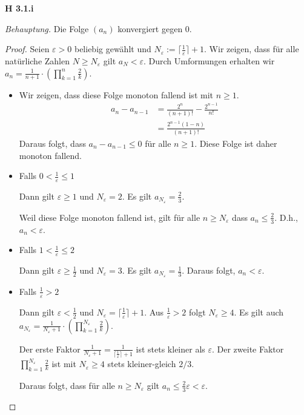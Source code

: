 \documentclass[12pt]{extarticle}
\begin{document}
\textbf{H 3.1.i}

\textit{Behauptung.} Die Folge \((a_n)\) konvergiert gegen 0.

\begin{proof}
  Seien \(\varepsilon > 0\) beliebig gewählt und
  \(N_{\varepsilon} := \lceil \frac{1}{\varepsilon} \rceil + 1\).  Wir
  zeigen, dass für alle natürliche Zahlen \(N \geq N_{\varepsilon}\)
  gilt \(a_N < \varepsilon\).  Durch Umformungen erhalten wir
  \(a_n=\frac{1}{n+1}\cdot \left( \prod_{k=1}^n{\frac{2}{k}} \right)\).

  \begin{itemize}
  \item Wir zeigen, dass diese Folge monoton fallend ist mit \(n \geq 1\).
\begin{align*}
  a_n-a_{n-1}&=\frac{2^n}{(n+1)!}-\frac{2^{n-1}}{n!}\\
             &=\frac{2^{n-1}(1-n)}{(n+1)!}
\end{align*}
Daraus folgt, dass \(a_n-a_{n-1} \leq 0\) für alle \(n \geq 1\).  Diese
Folge ist daher monoton fallend.
  \item Falls \(0<\frac{1}{\varepsilon}\leq 1\)

    Dann gilt  \(\varepsilon \geq 1\) und \(N_{\varepsilon}=2\).  Es gilt
    \(a_{N_{\varepsilon}}=\frac{2}{3}\).

    Weil diese Folge monoton fallend ist, gilt für alle
    \(n \geq N_{\varepsilon}\) dass \(a_n \leq \frac{2}{3}\).  D.h.,
    \(a_{n} < \varepsilon\).
  \item Falls \(1<\frac{1}{\varepsilon}\leq 2\)

    Dann gilt \(\varepsilon \geq \frac{1}{2}\) und
    \(N_{\varepsilon} = 3\).  Es gilt \(a_{N_{\varepsilon}}=\frac{1}{3}\).
    Daraus folgt, \(a_n < \varepsilon\).
  \item Falls \(\frac{1}{\varepsilon}>2\)

    Dann gilt \(\varepsilon < \frac{1}{2}\) und
    \(N_{\varepsilon}=\lceil \frac{1}{\varepsilon} \rceil + 1\).  Aus
    \(\frac{1}{\varepsilon}>2\) folgt \(N_{\varepsilon} \geq 4\).
    Es gilt auch
    $a_{N_{\varepsilon}}=\frac{1}{N_{\varepsilon}+1}\cdot \left(
      \prod_{k=1}^{N_{\varepsilon}}{\frac{2}{k}} \right)$.


    Der erste Faktor $\frac{1}{N_{\varepsilon}+1}=\frac{1}{\lceil
      \frac{1}{\varepsilon} \rceil +1}$ ist stets kleiner als \(\varepsilon\).
    Der zweite Faktor \(\prod_{k=1}^{N_{\varepsilon}}{\frac{2}{k}}\) ist
    mit \(N_{\varepsilon} \geq 4\) stets kleiner-gleich \(2/3\).

    Daraus folgt, dass für alle \(n \geq N_{\varepsilon}\) gilt $a_n
    \leq \frac{2}{3}\varepsilon < \varepsilon$.
  \end{itemize}
\end{proof}
\end{document}
